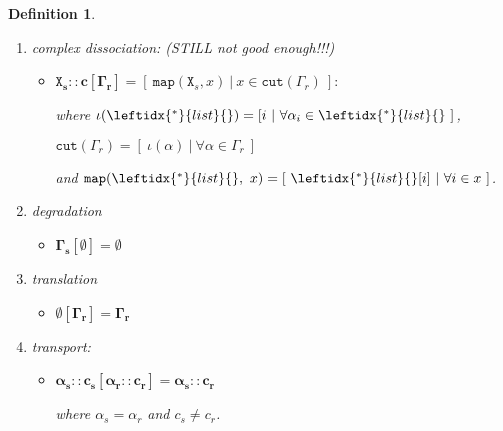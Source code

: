 \documentclass[12pt]{article}
\newtheorem{mydef}{Definition}
\begin{document}
\begin{mydef}
\begin{enumerate}
\begin{itemize}
\end{itemize}

\item \textit{complex dissociation}: (STILL not good enough!!!)

\begin{itemize}
\item $ \pmb{\mathtt{X}_s::c[\Gamma_r]} = [~\mathtt{map}(\mathtt{X}_s, x)~|~x \in \mathtt{cut}(\Gamma_r)~]:$

where $\iota(\leftidx{^*}{list}{}) = [i~|~\forall \alpha_i \in \leftidx{^*}{list}{}~]$,

$\mathtt{cut}(\Gamma_r) = [~\iota(\alpha)~|~\forall \alpha \in \Gamma_r~]$

and $\mathtt{map}(\leftidx{^*}{list}{},~x) = [~\leftidx{^*}{list}{}[i]~|~\forall i \in x~] $.

\end{itemize}

\item \textit{degradation}
\begin{itemize}
\item $  \pmb{\Gamma_s[\emptyset] = \emptyset} $
\end{itemize}

\item \textit{translation}
\begin{itemize}
\item $ \pmb{\emptyset[\Gamma_r] = \Gamma_r} $
\end{itemize}

\item \textit{transport}:
\begin{itemize}
\item $ \pmb{\alpha_s::c_s[\alpha_r::c_r] = \alpha_s::c_r} $

where $\alpha_s = \alpha_r$ and $ c_s \neq c_r $.
\end{itemize}

\end{enumerate}
\end{mydef}
\end{document}
